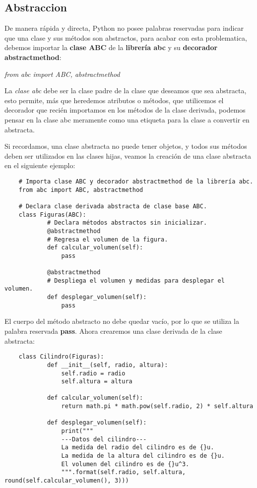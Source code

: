 \subsection{Abstraccion}
\hspace{0.55cm}De manera rápida y directa, Python no posee palabras reservadas para indicar que una clase y sus métodos son abstractos, para acabar con esta problematica, debemos importar la \textbf{clase ABC} de la \textbf{librería abc} y su \textbf{decorador abstractmethod}:
\begin{center}
	\textit{from abc import ABC, abstractmethod}
\end{center}

La \textit{clase abc} debe ser la clase padre de la clase que deseamos que sea abstracta, esto permite, más que heredemos atributos o métodos, que utilicemos el decorador que recién importamos en los métodos de la clase derivada, podemos pensar en la clase abc meramente como una etiqueta para la clase a convertir en abstracta.

Si recordamos, una clase abstracta no puede tener objetos, y todos sus métodos deben ser utilizados en las clases hijas, veamos la creación de una clase abstracta en el siguiente ejemplo:
\begin{lstlisting}
	# Importa clase ABC y decorador abstractmethod de la librería abc.
	from abc import ABC, abstractmethod

	# Declara clase derivada abstracta de clase base ABC.
	class Figuras(ABC):
    		# Declara métodos abstractos sin inicializar.
    		@abstractmethod
    		# Regresa el volumen de la figura.
    		def calcular_volumen(self):
        		pass

    		@abstractmethod
    		# Despliega el volumen y medidas para desplegar el volumen.
    		def desplegar_volumen(self):
        		pass
\end{lstlisting}

El cuerpo del método abstracto no debe quedar vacío, por lo que se utiliza la palabra reservada \textbf{pass}. Ahora crearemos una clase derivada de la clase abstracta:
\begin{lstlisting}
	class Cilindro(Figuras):
    		def __init__(self, radio, altura):
        		self.radio = radio
        		self.altura = altura

    		def calcular_volumen(self):
        		return math.pi * math.pow(self.radio, 2) * self.altura

    		def desplegar_volumen(self):
        		print("""
        		---Datos del cilindro---
        		La medida del radio del cilindro es de {}u.
        		La medida de la altura del cilindro es de {}u.
        		El volumen del cilindro es de {}u^3.
        		""".format(self.radio, self.altura, 										round(self.calcular_volumen(), 3)))
\end{lstlisting}

